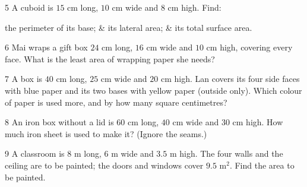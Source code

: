 \gap
\begin{probbox}{5}{\relax}
A cuboid is $15$ cm long, $10$ cm wide and $8$ cm high. Find:
\begin{cols3}
 the perimeter of its base; &  its lateral area; &  its total surface area.
\end{cols3}
\end{probbox}
\gap
\begin{probbox}{6}{\relax}
Mai wraps a gift box $24$ cm long, $16$ cm wide and $10$ cm high, covering every face. What is the least area of wrapping paper she needs?
\end{probbox}
\gap
\begin{probbox}{7}{\relax}
A box is $40$ cm long, $25$ cm wide and $20$ cm high. Lan covers its four side faces with blue paper and its two bases with yellow paper (outside only). Which colour of paper is used more, and by how many square centimetres?
\end{probbox}
\gap
\begin{probbox}{8}{\relax}
An iron box without a lid is $60$ cm long, $40$ cm wide and $30$ cm high. How much iron sheet is used to make it? (Ignore the seams.)
\end{probbox}
\gap
\begin{probbox}{9}{\relax}
A classroom is $8$ m long, $6$ m wide and $3.5$ m high. The four walls and the ceiling are to be painted; the doors and windows cover $9.5$ m$^2$. Find the area to be painted.
\end{probbox}
